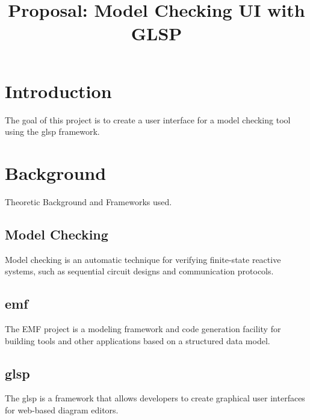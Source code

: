 \documentclass[conference,onecolumn]{IEEEtran}
\begin{document}
  \title{Proposal: Model Checking UI with GLSP}

  \author{
    }

  \maketitle

  \IEEEpeerreviewmaketitle

  \section{Introduction}
  \label{sec:introduction}
  The goal of this project is to create a user interface for a model checking tool using the \ac{glsp} framework. 

  \section{Background}
  \label{sec:background}
  Theoretic Background and Frameworks used.

  \subsection{Model Checking}
  \label{subsec:model-checking}
  Model checking is an automatic technique for verifying finite-state reactive systems, such as sequential circuit designs and communication protocols.
  \cite{modelchecking1} \cite{modelchecking2}

  \subsection{\ac{emf}}
  \label{subsec:emf}

  The EMF project is a modeling framework and code generation facility for building tools and other applications based on a structured data model.
  \cite{emf} \cite{emf-repo}

  \subsection{\ac{glsp}}
  \label{subsec:glsp}

  The \ac{glsp} is a framework that allows developers to create graphical user interfaces for web-based diagram editors.
  \cite{glsp-repo}
\end{document}
